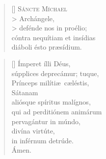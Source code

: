 \documentclass[omni.tex]{subfiles}
\begin{document}
\settowidth{\versewidth}{Et ne nos ind\'ucas in tentati\'onem}

\begin{verse}[\versewidth]
\lettrine[lhang=1.0,nindent=0em]{S}{\'ancte M\'ichael} \\>
Arch\'angele, \\>
def\'ende nos in pro\'elio; \\
c\'ontra nequ\'itiam et ins\'idias \\
di\'aboli \'esto pr\ae s\'idium.
\end{verse}

\begin{verse}[\versewidth]
\'Imperet \'illi D\'eus, \\
s\'upplices deprec\'amur; tuque, \\
Pr\'inceps mil\'iti\ae\ c\ae l\'estis, \\
S\'atanam \\
ali\'osque sp\'iritus mal\'ignos, \\
qui ad perditi\'onem anim\'arum \\
pervag\'antur in m\'undo, \\
div\'ina virt\'ute, \\
in inf\'ernum detr\'ude. \\
\'Amen. \\[0\baselineskip]
\end{verse}

\pagebreak
\end{document}
